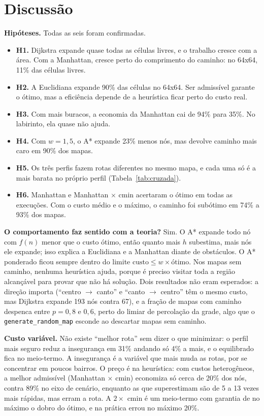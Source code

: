 \documentclass[11pt,a4paper]{article}
\begin{document}
\section{Discussão}

\textbf{Hipóteses.} Todas as seis foram confirmadas.
\begin{itemize}
  \item \textbf{H1.} Dijkstra expande quase todas as células livres, e o trabalho cresce com a área. Com a Manhattan,
    cresce perto do comprimento do caminho: no 64x64, 11\% das células livres.
  \item \textbf{H2.} A Euclidiana expande 90\% das células no 64x64. Ser admissível garante o ótimo, mas a eficiência
    depende de a heurística ficar perto do custo real.
  \item \textbf{H3.} Com mais buracos, a economia da Manhattan cai de 94\% para 35\%. No labirinto, ela quase não ajuda.
  \item \textbf{H4.} Com $w = 1{,}5$, o A* expande 23\% menos nós, mas devolve caminho mais caro em 90\% dos mapas.
  \item \textbf{H5.} Os três perfis fazem rotas diferentes no mesmo mapa, e cada uma só é a mais barata no próprio
    perfil (Tabela~\ref{tab:cruzada}).
  \item \textbf{H6.} Manhattan e Manhattan $\times$ cmin acertaram o ótimo em todas as execuções. Com o custo médio e
    o máximo, o caminho foi subótimo em 74\% a 93\% dos mapas.
\end{itemize}

\textbf{O comportamento faz sentido com a teoria?} Sim. O A* expande todo nó com $f(n)$ menor que o custo ótimo, então
quanto mais $h$ subestima, mais nós ele expande; isso explica a Euclidiana e a Manhattan diante de obstáculos. O A*
ponderado ficou sempre dentro do limite $\text{custo} \le w \times \text{ótimo}$. Nos mapas sem caminho, nenhuma
heurística ajuda, porque é preciso visitar toda a região alcançável para provar que não há solução. Dois resultados
não eram esperados: a direção importa (``centro $\to$ canto'' e ``canto $\to$ centro'' têm o mesmo custo, mas Dijkstra
expande 193 nós contra 67), e a fração de mapas com caminho despenca entre $p = 0{,}8$ e $0{,}6$, perto do limiar de
percolação da grade, algo que o \texttt{generate\_random\_map} esconde ao descartar mapas sem caminho.

\textbf{Custo variável.} Não existe ``melhor rota'' sem dizer o que minimizar: o perfil mais seguro reduz a
insegurança em 31\% andando só 4\% a mais, e o equilibrado fica no meio-termo. A insegurança é a variável que mais muda
as rotas, por se concentrar em poucos bairros. O preço é na heurística: com custos heterogêneos, a melhor admissível
(Manhattan $\times$ cmin) economiza só cerca de 20\% dos nós, contra 89\% no eixo de cenário, enquanto as que
superestimam são de 5 a 13 vezes mais rápidas, mas erram a rota. A $2 \times$ cmin é um meio-termo com garantia de no
máximo o dobro do ótimo, e na prática errou no máximo 20\%.
\end{document}
